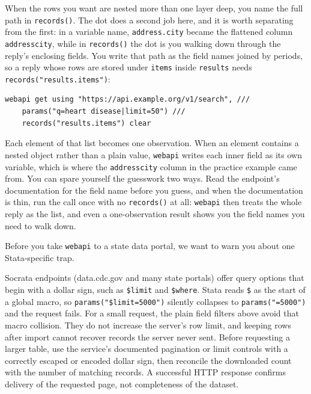 \documentclass[
    a4paper,
    fontsize=10pt,
    twoside=true,
    numbers=noenddot,
]{kaobook}
\newenvironment{vizcallout}[1][Visualization to build]{%
    \begin{vizbox}[frametitle={#1}]%
}{%
    \end{vizbox}%
}
\begin{document}
When the rows you want are nested more than one layer deep, you name the full path in \texttt{records()}. The dot does a second job here, and it is worth separating from the first: in a variable name, \texttt{address.city} became the flattened column \texttt{addresscity}, while in \texttt{records()} the dot is you walking down through the reply's enclosing fields. You write that path as the field names joined by periods, so a reply whose rows are stored under \texttt{items} inside \texttt{results} needs \texttt{records("results.items")}:
\par
{\footnotesize
\begin{verbatim}
webapi get using "https://api.example.org/v1/search", ///
    params("q=heart disease|limit=50") ///
    records("results.items") clear
\end{verbatim}
}
Each element of that list becomes one observation. When an element contains a nested object rather than a plain value, \texttt{webapi} writes each inner field as its own variable, which is where the \texttt{addresscity} column in the practice example came from. You can spare yourself the guesswork two ways. Read the endpoint's documentation for the field name before you guess, and when the documentation is thin, run the call once with no \texttt{records()} at all: \texttt{webapi} then treats the whole reply as the list, and even a one-observation result shows you the field names you need to walk down.

Before you take \texttt{webapi} to a state data portal, we want to warn you about one Stata-specific trap.

\begin{vizcallout}[The one JSON trap in Stata: the \$ sign]
Socrata endpoints (data.cdc.gov and many state portals) offer query options that begin with a dollar sign, such as \texttt{\$limit} and \texttt{\$where}. Stata reads \texttt{\$} as the start of a global macro, so \texttt{params("\$limit=5000")} silently collapses to \texttt{params("=5000")} and the request fails. For a small request, the plain field filters above avoid that macro collision. They do not increase the server's row limit, and keeping rows after import cannot recover records the server never sent. Before requesting a larger table, use the service's documented pagination or limit controls with a correctly escaped or encoded dollar sign, then reconcile the downloaded count with the number of matching records. A successful HTTP response confirms delivery of the requested page, not completeness of the dataset.
\end{vizcallout}
\end{document}
